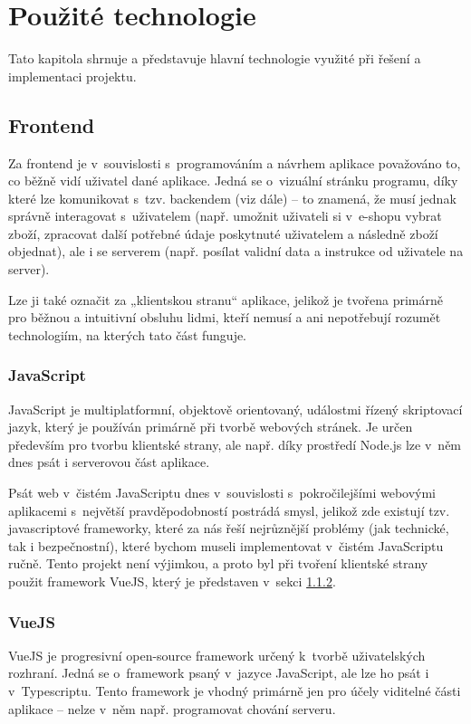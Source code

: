 \chapter{Použité technologie}
Tato kapitola shrnuje a představuje hlavní technologie využité při řešení a implementaci projektu.

\section{Frontend}
Za frontend je v~souvislosti s~programováním a návrhem aplikace považováno to, co běžně vidí uživatel dané aplikace. Jedná se o~vizuální stránku programu, díky které lze komunikovat s~tzv. backendem (viz dále) – to znamená, že musí jednak správně interagovat s~uživatelem (např. umožnit uživateli si v~e-shopu vybrat zboží, zpracovat další potřebné údaje poskytnuté uživatelem a následně zboží objednat), ale i se serverem (např. posílat validní data a instrukce od uživatele na server).

Lze ji také označit za „klientskou stranu“ aplikace, jelikož je tvořena primárně pro běžnou a intuitivní obsluhu lidmi, kteří nemusí a ani nepotřebují rozumět technologiím, na kterých tato část funguje. \cite{FEvsBE}

	\subsection{JavaScript}
	JavaScript je multiplatformní, objektově orientovaný, událostmi řízený skriptovací jazyk, který je používán primárně při tvorbě webových stránek. Je určen především pro tvorbu klientské strany, ale např. díky prostředí Node.js lze v~něm dnes psát i serverovou část aplikace. \cite{JS1}\cite{JS2}
	
	Psát web v~čistém JavaScriptu dnes v~souvislosti s~pokročilejšími webovými aplikacemi s~největší pravděpodobností postrádá smysl, jelikož zde existují tzv. javascriptové frameworky, které za nás řeší nejrůznější problémy (jak technické, tak i bezpečnostní), které bychom museli implementovat v~čistém JavaScriptu ručně. Tento projekt není výjimkou, a proto byl při tvoření klientské strany použit framework VueJS, který je představen v~sekci \ref{sec:vuejs}.
	
	\subsection{VueJS}\label{sec:vuejs}
	VueJS je progresivní open-source framework určený k~tvorbě uživatelských rozhraní. Jedná se o~framework psaný v~jazyce JavaScript, ale lze ho psát i v~Typescriptu. Tento framework je vhodný primárně jen pro účely viditelné části aplikace – nelze v~něm např. programovat chování serveru. \cite{VueJS1}
	
